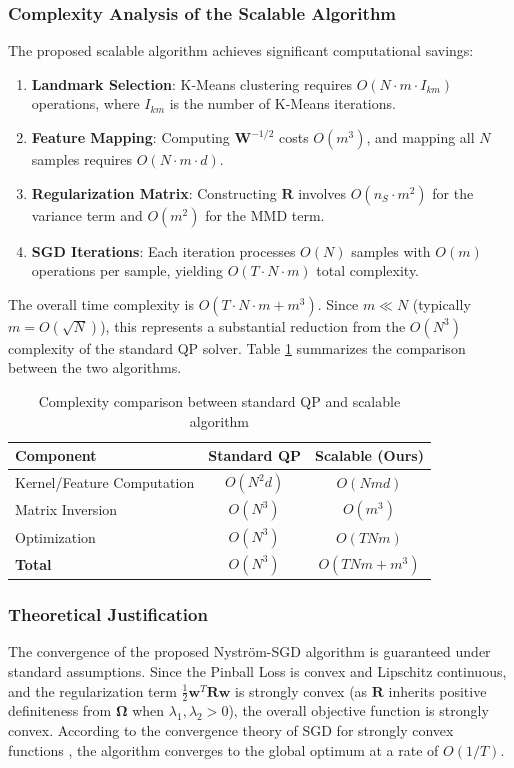 \documentclass[a4paper]{cas-sc}
\begin{document}
\subsubsection{Complexity Analysis of the Scalable Algorithm}
The proposed scalable algorithm achieves significant computational savings:
\begin{enumerate}
    \item \textbf{Landmark Selection}: K-Means clustering requires $O(N \cdot m \cdot I_{km})$ operations, where $I_{km}$ is the number of K-Means iterations.
    \item \textbf{Feature Mapping}: Computing $\boldsymbol{W}^{-1/2}$ costs $O(m^3)$, and mapping all $N$ samples requires $O(N \cdot m \cdot d)$.
    \item \textbf{Regularization Matrix}: Constructing $\boldsymbol{R}$ involves $O(n_S \cdot m^2)$ for the variance term and $O(m^2)$ for the MMD term.
    \item \textbf{SGD Iterations}: Each iteration processes $O(N)$ samples with $O(m)$ operations per sample, yielding $O(T \cdot N \cdot m)$ total complexity.
\end{enumerate}

The overall time complexity is $O(T \cdot N \cdot m + m^3)$. Since $m \ll N$ (typically $m = O(\sqrt{N})$), this represents a substantial reduction from the $O(N^3)$ complexity of the standard QP solver. Table \ref{tab:complexity} summarizes the comparison between the two algorithms.

\begin{table}[htbp]
\centering
\caption{Complexity comparison between standard QP and scalable algorithm}
\label{tab:complexity}
\begin{tabular}{lcc}
\toprule
\textbf{Component} & \textbf{Standard QP} & \textbf{Scalable (Ours)} \\
\midrule
Kernel/Feature Computation & $O(N^2 d)$ & $O(N m d)$ \\
Matrix Inversion & $O(N^3)$ & $O(m^3)$ \\
Optimization & $O(N^3)$ & $O(T N m)$ \\
\midrule
\textbf{Total} & $O(N^3)$ & $O(T N m + m^3)$ \\
\bottomrule
\end{tabular}
\end{table}

\subsubsection{Theoretical Justification}
The convergence of the proposed Nystr\"{o}m-SGD algorithm is guaranteed under standard assumptions. Since the Pinball Loss is convex and Lipschitz continuous, and the regularization term $\frac{1}{2}\boldsymbol{w}^T \boldsymbol{R} \boldsymbol{w}$ is strongly convex (as $\boldsymbol{R}$ inherits positive definiteness from $\boldsymbol{\Omega}$ when $\lambda_1, \lambda_2 > 0$), the overall objective function is strongly convex. According to the convergence theory of SGD for strongly convex functions \citep{bottou2018optimization}, the algorithm converges to the global optimum at a rate of $O(1/T)$.
\end{document}
